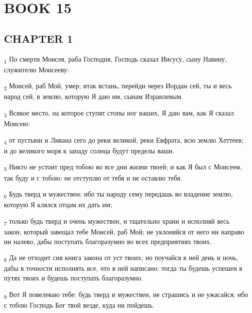 \section{BOOK 15}
\subsection{CHAPTER 1}
\begin{tcolorbox}
\textsubscript{1} По смерти Моисея, раба Господня, Господь сказал Иисусу, сыну Навину, служителю Моисееву:
\end{tcolorbox}
\begin{tcolorbox}
\textsubscript{2} Моисей, раб Мой, умер; итак встань, перейди через Иордан сей, ты и весь народ сей, в землю, которую Я даю им, сынам Израилевым.
\end{tcolorbox}
\begin{tcolorbox}
\textsubscript{3} Всякое место, на которое ступят стопы ног ваших, Я даю вам, как Я сказал Моисею:
\end{tcolorbox}
\begin{tcolorbox}
\textsubscript{4} от пустыни и Ливана сего до реки великой, реки Евфрата, всю землю Хеттеев; и до великого моря к западу солнца будут пределы ваши.
\end{tcolorbox}
\begin{tcolorbox}
\textsubscript{5} Никто не устоит пред тобою во все дни жизни твоей; и как Я был с Моисеем, так буду и с тобою: не отступлю от тебя и не оставлю тебя.
\end{tcolorbox}
\begin{tcolorbox}
\textsubscript{6} Будь тверд и мужествен; ибо ты народу сему передашь во владение землю, которую Я клялся отцам их дать им;
\end{tcolorbox}
\begin{tcolorbox}
\textsubscript{7} только будь тверд и очень мужествен, и тщательно храни и исполняй весь закон, который завещал тебе Моисей, раб Мой; не уклоняйся от него ни направо ни налево, дабы поступать благоразумно во всех предприятиях твоих.
\end{tcolorbox}
\begin{tcolorbox}
\textsubscript{8} Да не отходит сия книга закона от уст твоих; но поучайся в ней день и ночь, дабы в точности исполнять все, что в ней написано: тогда ты будешь успешен в путях твоих и будешь поступать благоразумно.
\end{tcolorbox}
\begin{tcolorbox}
\textsubscript{9} Вот Я повелеваю тебе: будь тверд и мужествен, не страшись и не ужасайся; ибо с тобою Господь Бог твой везде, куда ни пойдешь.
\end{tcolorbox}
